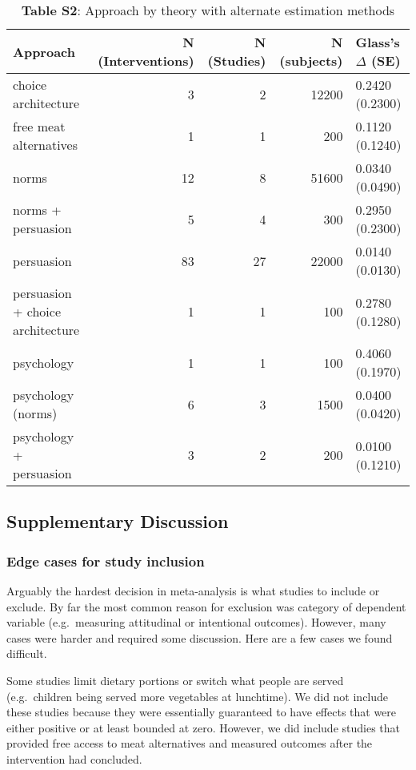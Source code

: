 \documentclass[sn-nature,pdflatex]{sn-jnl}
\begin{document}
\begin{table}[!h]
\centering
\caption{\label{tab:supp_table_two}\textbf{Table S2}: Approach by theory with alternate estimation methods }
\centering
\begin{tabular}[t]{lrrrl}
\toprule
Approach & N (Interventions) & N (Studies) & N (subjects) & Glass's $\Delta$ (SE)\\
\midrule
choice architecture & 3 & 2 & 12200 & 0.2420 (0.2300)\\
free meat alternatives & 1 & 1 & 200 & 0.1120 (0.1240)\\
norms & 12 & 8 & 51600 & 0.0340 (0.0490)\\
norms + persuasion & 5 & 4 & 300 & 0.2950 (0.2300)\\
persuasion & 83 & 27 & 22000 & 0.0140 (0.0130)\\
\addlinespace
persuasion + choice architecture & 1 & 1 & 100 & 0.2780 (0.1280)\\
psychology & 1 & 1 & 100 & 0.4060 (0.1970)\\
psychology (norms) & 6 & 3 & 1500 & 0.0400 (0.0420)\\
psychology + persuasion & 3 & 2 & 200 & 0.0100 (0.1210)\\
\bottomrule
\end{tabular}
\end{table}

\subsection{Supplementary Discussion}\label{supplementary-discussion}

\subsubsection{Edge cases for study
inclusion}\label{edge-cases-for-study-inclusion}

Arguably the hardest decision in meta-analysis is what studies to
include or exclude. By far the most common reason for exclusion was
category of dependent variable (e.g.~measuring attitudinal or
intentional outcomes). However, many cases were harder and required some
discussion. Here are a few cases we found difficult.

Some studies limit dietary portions or switch what people are served
(e.g.~children being served more vegetables at lunchtime). We did not
include these studies because they were essentially guaranteed to have
effects that were either positive or at least bounded at zero. However,
we did include studies that provided free access to meat alternatives
\citep{acharya2004, bianchi2022} and measured outcomes after the
intervention had concluded.
\end{document}
